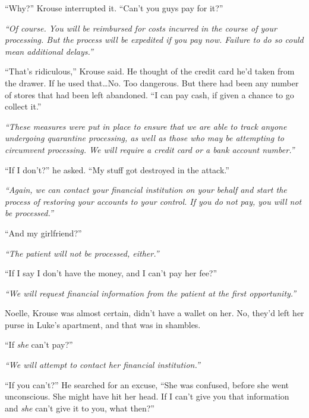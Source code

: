 ``Why?''  Krouse interrupted it.  ``Can't you guys pay for it?''



\emph{``Of course.  You will be reimbursed for costs incurred in the course of your processing.  But the process will be expedited if you pay now.  Failure to do so could mean additional delays.''}



``That's ridiculous,'' Krouse said.  He thought of the credit card he'd taken from the drawer. If he used that\ldots  No.  Too dangerous.  But there had been any number of stores that had been left abandoned.  ``I can pay cash, if given a chance to go collect it.''



\emph{``These measures were put in place to ensure that we are able to track anyone undergoing quarantine processing, as well as those who may be attempting to circumvent processing.  We will require a credit card or a bank account number.''}



``If I don't?'' he asked.  ``My stuff got destroyed in the attack.''



\emph{``Again, we can contact your financial institution on your behalf and start the process of restoring your accounts to your control.  If you do not pay, you will not be processed.''}



``And my girlfriend?''



\emph{``The patient will not be processed, either.''}



``If I say I don't have the money, and I can't pay her fee?''



\emph{``We will request financial information from the patient at the first opportunity.''}



Noelle, Krouse was almost certain, didn't have a wallet on her.  No, they'd left her purse in Luke's apartment, and that was in shambles.



``If \emph{she} can't pay?''



\emph{``We will attempt to contact her financial institution.''}



``If you can't?''  He searched for an excuse, ``She was confused, before she went unconscious.  She might have hit her head.  If I can't give you that information and \emph{she} can't give it to you, what then?''



